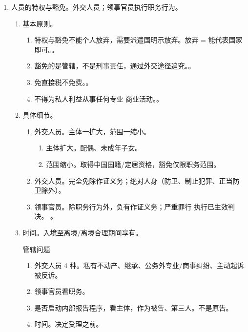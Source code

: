 \begin{enumerate}
\begin{enumerate}
\begin{enumerate}
                \end{enumerate}
        \end{enumerate}
  \item 人员的特权与豁免。外交人员；领事官员执行职务行为。
        \begin{enumerate}
          \item 基本原则。
                \begin{enumerate}
                  \item 特权与豁免不能个人放弃，需要派遣国明示放弃。放弃 = 能代表国家即可。。
                  \item 豁免的是管辖，不是刑事责任，通过外交途径追究。。
                  \item 免直接税不免费。。
                  \item 不得为私人利益从事任何专业 \hz 商业活动。。
                \end{enumerate}
          \item 具体细节。
                \begin{enumerate}
                  \item 外交人员。主体一扩大，范围一缩小。
                        \begin{enumerate}
                          \item 主体扩大。配偶、未成年子女。
                          \item 范围缩小。取得中国国籍/定居资格，豁免仅限职务范围。
                        \end{enumerate}
                  \item 外交人员。完全免除作证义务；绝对人身（防卫、制止犯罪、正当防卫除外）。
                  \item 领事官员。除职务行为外，负有作证义务；严重罪行 \hz 执行已生效判决。
                        。
                \end{enumerate}
          \item 时间。入境至离境/离境合理期间享有。
                \begin{kk}{管辖问题}
                  \begin{enumerate}
                    \item 外交人员 4 种。私有不动产、继承、公务外专业/商事纠纷、主动起诉被反诉。
                    \item 领事官员看职务。
                    \item 是否启动内部报告程序，看主体，作为被告、第三人。不是原告。
                    \item 时间。决定受理之前。
                  \end{enumerate}
                \end{kk}
        \end{enumerate}
\end{enumerate}
